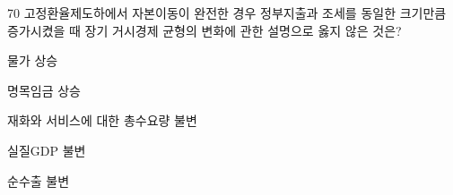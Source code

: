 \begin{question}{70}
고정환율제도하에서 자본이동이 완전한 경우 정부지출과 조세를 동일한 크기만큼 증가시켰을 때 장기 거시경제 균형의 변화에 관한 설명으로 옳지 않은 것은?
\begin{choices}
  \item 물가 상승
  \item 명목임금 상승
  \item 재화와 서비스에 대한 총수요량 불변
  \item 실질GDP 불변
  \item 순수출 불변
\end{choices}
\end{question}
